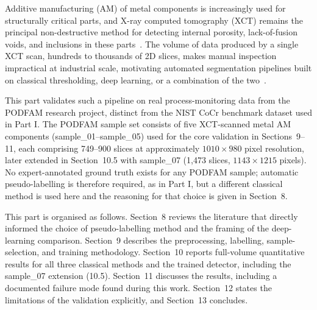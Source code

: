 
Additive manufacturing (AM) of metal components is increasingly used for structurally critical
parts, and X-ray computed tomography (XCT) remains the principal non-destructive method for
detecting internal porosity, lack-of-fusion voids, and inclusions in these
parts~\citep{Deshpande2024,Zhang2021}. The volume of data produced by a single XCT scan, hundreds to
thousands of 2D slices, makes manual inspection impractical at industrial scale, motivating
automated segmentation pipelines built on classical thresholding, deep learning, or a combination of
the two~\citep{Zubayer2023}.

This part validates such a pipeline on real process-monitoring data from the PODFAM research
project, distinct from the NIST CoCr benchmark dataset used in Part I. The PODFAM sample set
consists of five XCT-scanned metal AM components (sample\_01--sample\_05) used for the core
validation in Sections~9--11, each comprising 749--900 slices at approximately $1010\times980$ pixel
resolution, later extended in Section~10.5 with sample\_07 (1,473 slices, $1143\times1215$ pixels).
No expert-annotated ground truth exists for any PODFAM sample; automatic pseudo-labelling is
therefore required, as in Part I, but a different classical method is used here and the reasoning
for that choice is given in Section~8.

This part is organised as follows. Section~8 reviews the literature that directly informed the
choice of pseudo-labelling method and the framing of the deep-learning comparison. Section~9
describes the preprocessing, labelling, sample-selection, and training methodology. Section~10
reports full-volume quantitative results for all three classical methods and the trained detector,
including the sample\_07 extension (10.5). Section~11 discusses the results, including a documented
failure mode found during this work. Section~12 states the limitations of the validation explicitly,
and Section~13 concludes.
